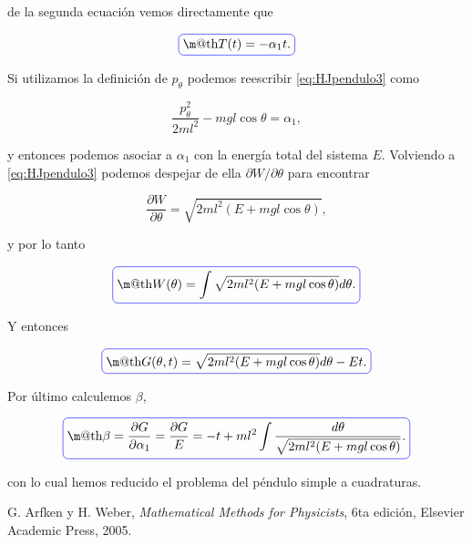 \documentclass[a4paper,10pt]{article}
\makeatletter
\numberwithin{equation}{section}
\newcommand*{\boxcolor}{blue}
\renewcommand{\boxed}[1]{\textcolor{\boxcolor}{%
\tikz[baseline={([yshift=-1ex]current bounding box.center)}] \node [rectangle, minimum width=1ex,rounded corners,draw] {\normalcolor\m@th$\displaystyle#1$};}}
\makeatother
\begin{document}
de la segunda ecuación vemos directamente que 

\begin{equation}
 \boxed{T(t) = - \alpha_1t.}
\end{equation}

Si utilizamos la definición de $p_\theta$ podemos reescribir \eqref{eq:HJpendulo3} 
como 

\begin{equation}
 \frac{p_\theta^2}{2ml^2} - mgl\cos{\theta} = 
 \alpha_1,
\end{equation}

y entonces podemos asociar a $\alpha_1$ con la energía total del sistema $E$. Volviendo 
a \eqref{eq:HJpendulo3} podemos despejar de ella $\partial W/\partial \theta$ para 
encontrar 

\begin{equation}
 \frac{\partial W}{\partial \theta} = \sqrt{2ml^2(E + mgl\cos{\theta})},
\end{equation}

y por lo tanto 

\begin{equation}
 \boxed{W(\theta) = \int \sqrt{2ml^2(E + mgl\cos{\theta})} d\theta.}
\end{equation}

Y entonces 

\begin{equation}
 \boxed{G(\theta,t) = \sqrt{2ml^2(E + mgl\cos{\theta})} d\theta - Et.}
\end{equation}

Por último calculemos $\beta$, 

\begin{equation}
 \boxed{\beta = \frac{\partial G}{\partial \alpha_1} = \frac{\partial G}{E} = 
 - t + ml^2 \int \frac{d\theta}{\sqrt{2ml^2(E + mgl\cos{\theta})}}.}
\end{equation}

\vspace{.2cm}

con lo cual hemos reducido el problema del péndulo simple a cuadraturas.

\begin{thebibliography}{10}
G. Arfken y H. Weber, \emph{Mathematical Methods for Physicists}, 6ta edición, Elsevier 
Academic Press, 2005.
\end{thebibliography}
\end{document}
